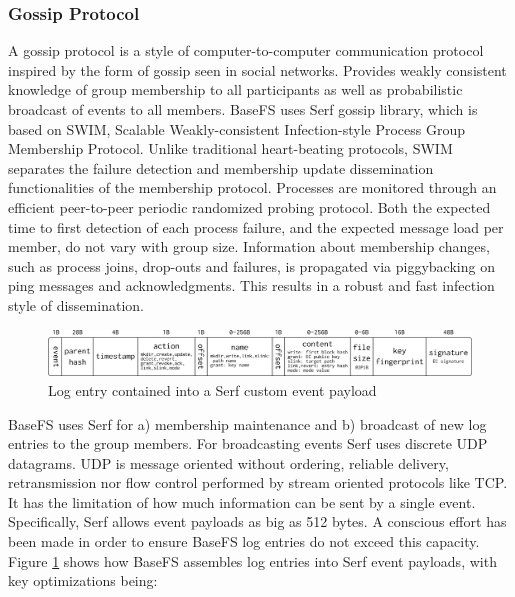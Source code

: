 \documentclass{sig-alternate}
\begin{document}
\subsubsection{Gossip Protocol}\label{gossip-protocol}

A gossip protocol is a style of computer-to-computer communication protocol inspired by the form of gossip seen in social networks. Provides weakly consistent knowledge of group membership to all participants as well as probabilistic broadcast of events to all members. BaseFS uses Serf gossip library, which is based on SWIM, Scalable Weakly-consistent Infection-style Process Group Membership Protocol\cite{SWIM}. Unlike traditional heart-beating protocols, SWIM separates the failure detection and membership update dissemination functionalities of the membership protocol. Processes are monitored through an efficient peer-to-peer periodic randomized probing protocol. Both the expected time to first detection of each process failure, and the expected message load per member, do not vary with group size. Information about membership changes, such as process joins, drop-outs and failures, is propagated via piggybacking on ping messages and acknowledgments. This results in a robust and fast infection style of dissemination. 


\begin{figure}
\centering
\includegraphics[width=\textwidth]{imgs/payload.png}
\caption{Log entry contained into a Serf custom event payload}
\label{fig:payload}
\end{figure}

BaseFS uses Serf for a) membership maintenance and b) broadcast of new log entries to the group members. For broadcasting events Serf uses discrete UDP datagrams. UDP is message oriented without ordering, reliable delivery, retransmission nor flow control performed by stream oriented protocols like TCP. It has the limitation of how much information can be sent by a single event. Specifically, Serf allows event payloads as big as 512 bytes. A conscious effort has been made in order to ensure BaseFS log entries do not exceed this capacity. Figure \ref{fig:payload} shows how BaseFS assembles log entries into Serf event payloads, with key optimizations being:
\end{document}
